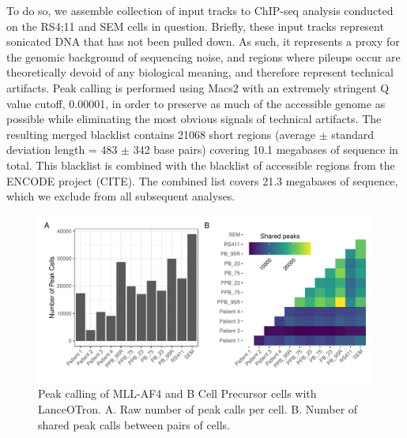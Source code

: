 To do so, we assemble collection of input tracks to ChIP-seq analysis conducted on the RS4;11 and SEM cells in question. Briefly, these input tracks represent sonicated DNA that has not been pulled down. As such, it represents a proxy for the genomic background of sequencing noise, and regions where pileups occur are theoretically devoid of any biological meaning, and therefore represent technical artifacts. Peak calling is performed using Macs2 with an extremely stringent Q value cutoff, 0.00001, in order to preserve as much of the accessible genome as possible while eliminating the most obvious signals of technical artifacts. The resulting merged blacklist contains 21068 short regions (average $\pm$ standard deviation length = 483 $\pm$ 342 base pairs) covering 10.1 megabases of sequence in total. This blacklist is combined with the blacklist of accessible regions from the ENCODE project (CITE). The combined list covers 21.3 megabases of sequence, which we exclude from all subsequent analyses.

\begin{figure}
    \centering
    \includegraphics[width=\textwidth]{plot/ch5/mll_redo_shared_peaks.pdf}
    \caption{Peak calling of MLL-AF4 and B Cell Precursor cells with LanceOTron. A. Raw number of peak calls per cell. B. Number of shared peak calls between pairs of cells.}
    \label{fig:mll_peak_calls}
\end{figure}

